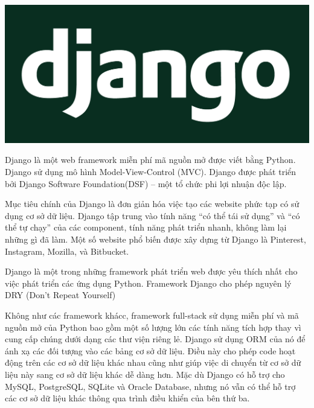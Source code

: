 \begin{center}
  \captionsetup{type=figure}
  \includegraphics[width=15cm]{img/django.png}
\end{center}

Django là một web framework miễn phí mã nguồn mở được viết bằng Python. Django sử dụng mô hình Model-View-Control (MVC). Django được phát triển bởi Django Software Foundation(DSF) – một tổ chức phi lợi nhuận độc lập.

Mục tiêu chính của Django là đơn giản hóa việc tạo các website phức tạp có sử dụng cơ sở dữ liệu. Django tập trung vào tính năng “có thể tái sử dụng” và “có thể tự chạy” của các component, tính năng phát triển nhanh, không làm lại những gì đã làm. Một số website phổ biến được xây dựng từ Django là Pinterest, Instagram, Mozilla, và Bitbucket.

Django là một trong những framework phát triển web được yêu thích nhất cho việc phát triển các ứng dụng Python. Framework Django cho phép nguyên lý DRY (Don't Repeat Yourself) 

Không như các framework khácc, framework full-stack sử dụng miễn phí và mã nguồn mở của Python bao gồm một số lượng lớn các tính năng tích hợp thay vì cung cấp chúng dưới dạng các thư viện riêng lẻ. Django sử dụng ORM của nó để ánh xạ các đối tượng vào các bảng cơ sở dữ liệu. Điều này cho phép code hoạt động trên các cơ sở dữ liệu khác nhau cũng như giúp việc di chuyển từ cơ sở dữ liệu này sang cơ sở dữ liệu khác dễ dàng hơn. Mặc dù Django có hỗ trợ cho MySQL, PostgreSQL, SQLite và Oracle Database, nhưng nó vẫn có thể hỗ trợ các cơ sở dữ liệu khác thông qua trình điều khiển của bên thứ ba.

